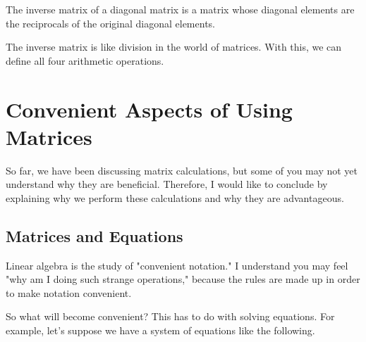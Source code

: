 \documentclass{ltjsbook}
\begin{document}
The inverse matrix of a diagonal matrix is a matrix whose diagonal elements are the reciprocals of the original diagonal elements.


The inverse matrix is like division in the world of matrices. With this, we can define all four arithmetic operations.

\section{Convenient Aspects of Using Matrices}
\label{MatrixAndEauqtion}
So far, we have been discussing matrix calculations, but some of you may not yet understand why they are beneficial. Therefore, I would like to conclude by explaining why we perform these calculations and why they are advantageous.
\subsection{Matrices and Equations}
Linear algebra is the study of "convenient notation." I understand you may feel "why am I doing such strange operations," because the rules are made up in order to make notation convenient.

So what will become convenient? This has to do with solving equations.
For example, let's suppose we have a system of equations like the following.
\end{document}
